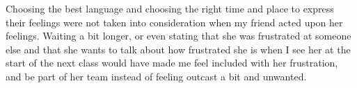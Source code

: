 \documentclass[12pt]{article}
\begin{document}

\par
Choosing the best language and choosing the right time and place to express their feelings were not taken into consideration when my friend acted upon her feelings. Waiting a bit longer, or even stating that she was frustrated at someone else and that she wants to talk about how frustrated she is when I see her at the start of the next class would have made me feel included with her frustration, and be part of her team instead of feeling outcast a bit and unwanted.
\end{document}
